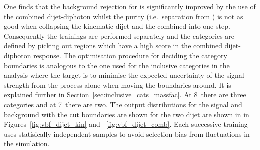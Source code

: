 One finds that the background rejection for \VBF is significantly improved by the use of the combined dijet-diphoton \BDT whilst the \VBF purity (i.e.~separation from \ggH) is not as good when collapsing the kinematic dijet \BDT and the combined \BDT into one step. Consequently the trainings are performed separately and the \VBF categories are defined by picking out regions which have a high score in the combined dijet-diphoton \BDT response. The optimisation procedure for deciding the category boundaries is analogous to the one used for the inclusive categories in the \MFM analysis where the target is to minimise the expected uncertainty of the signal strength from the \VBF process alone when moving the boundaries around. It is explained further in Section~\ref{sec:inclusive_cats_massfac}. At 8~\TeV there are three \VBF categories and at 7~\TeV there are two. The output distributions for the signal and background with the cut boundaries are shown for the two dijet \BDTs are shown in in Figures~\ref{fig:vbf_dijet_kin} and ~\ref{fig:vbf_dijet_comb}. Each successive \BDT training uses statisically independent \MC samples to avoid selection bias from fluctuations in the simulation. 

